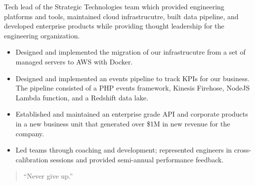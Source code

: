 \documentclass[10pt,a4paper,ragged2e,withhyper]{altacv}
\begin{document}
\begin{paracol}{2}
Tech lead of the Strategic Technologies team which provided engineering platforms and tools, maintained cloud infrastrucutre, built data pipeline, and developed enterprise products while providing thought leadership for the engineering organization.
\begin{itemize}
\item Designed and implemented the migration of our infrastrucutre from a set of managed servers to AWS with Docker.
\item Designed and implemented an events pipeline to track KPIs for our business. The pipeline consisted of a PHP events framework, Kinesis Firehose, NodeJS Lambda function, and a Redshift data lake.
\item Established and maintained an enterprise grade API and corporate products in a new business unit that generated over \$1M in new revenue for the company.
\item Led teams through coaching and development; represented engineers in cross-calibration sessions and provided semi-annual performance feedback.
\end{itemize}


\divider{}



\divider{}


\switchcolumn

\begin{quote}
``Never give up.''
\end{quote}






\end{paracol}
\end{document}
